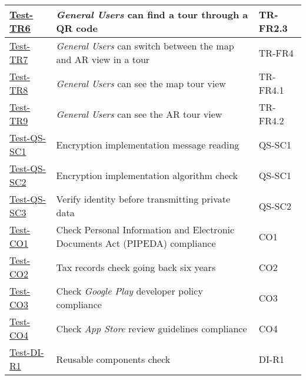 \documentclass[12pt, titlepage]{article}
\begin{document}
\begin{table}[htpb!]
  \centering
  \begin{tabular}{|l|p{8cm}|p{3cm}|}
    \hline
    \hyperref[itm:Test-TR6]{Test-TR6}       & \textit{General Users} can find a tour through a QR code                                  & TR-FR2.3       \\
    \hline
    \hyperref[itm:Test-TR7]{Test-TR7}       & \textit{General Users} can switch between the map and AR view in a tour                   & TR-FR4         \\
    \hline
    \hyperref[itm:Test-TR8]{Test-TR8}       & \textit{General Users} can see the map tour view                                          & TR-FR4.1       \\
    \hline
    \hyperref[itm:Test-TR9]{Test-TR9}       & \textit{General Users} can see the AR tour view                                           & TR-FR4.2       \\
    \hline
    \hyperref[itm:Test-QS-SC1]{Test-QS-SC1} & Encryption implementation message reading                                                 & QS-SC1         \\
    \hline
    \hyperref[itm:Test-QS-SC2]{Test-QS-SC2} & Encryption implementation algorithm check                                                 & QS-SC1         \\
    \hline
    \hyperref[itm:Test-QS-SC3]{Test-QS-SC3} & Verify identity before transmitting private data                                          & QS-SC2         \\
    \hline
    \hyperref[itm:Test-CO1]{Test-CO1}       & Check Personal Information and Electronic Documents Act (PIPEDA) \cite{PIPEDA} compliance & CO1            \\
    \hline
    \hyperref[itm:Test-CO2]{Test-CO2}       & Tax records check going back six years                                                    & CO2            \\
    \hline
    \hyperref[itm:Test-CO3]{Test-CO3}       & Check \textit{Google Play} developer policy \cite{GooglePlay} compliance                  & CO3            \\
    \hline
    \hyperref[itm:Test-CO4]{Test-CO4}       & Check \textit{App Store} review guidelines \cite{AppStore} compliance                     & CO4            \\
    \hline
    \hyperref[itm:Test-DI-R1]{Test-DI-R1}   & Reusable components check                                                                 & DI-R1          \\

\end{tabular}
\end{table}
\end{document}
